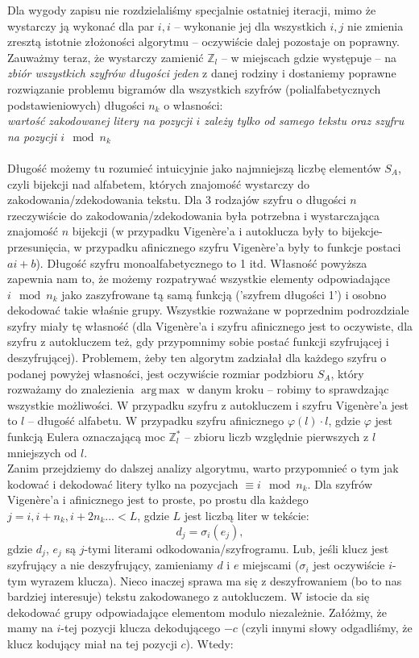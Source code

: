\documentclass[a4paper]{article}
\DeclareMathOperator*{\argmax}{arg\,max}
\theoremstyle{defn}
\theoremstyle{theorem}
\theoremstyle{lemma}
\theoremstyle{cor}
\theoremstyle{fact}
\begin{document}
Dla wygody zapisu nie rozdzielaliśmy specjalnie ostatniej iteracji, mimo że wystarczy ją wykonać dla par $i,i$ – wykonanie jej dla wszystkich $i,j$ nie zmienia zresztą istotnie złożoności algorytmu – oczywiście dalej pozostaje on poprawny.
Zauważmy teraz, że wystarczy zamienić $\mathbb{Z}_l$ – w miejscach gdzie występuje – na \textit{zbiór wszystkich szyfrów długości jeden} z danej rodziny i dostaniemy poprawne rozwiązanie problemu bigramów dla wszystkich szyfrów (polialfabetycznych podstawieniowych) długości $n_k$ o własności:\\
\textit{wartość zakodowanej litery na pozycji $i$ zależy tylko od samego tekstu oraz szyfru na pozycji $i \mod n_k$}\\\\
Długość możemy tu rozumieć intuicyjnie jako najmniejszą liczbę elementów $S_A$, czyli bijekcji nad alfabetem, których znajomość wystarczy do zakodowania/zdekodowania tekstu. Dla 3 rodzajów szyfru o długości $n$ rzeczywiście do zakodowania/zdekodowania była potrzebna i wystarczająca znajomość $n$ bijekcji (w przypadku Vigenère'a i autoklucza były to bijekcje-przesunięcia, w przypadku afinicznego szyfru Vigenère'a były to funkcje postaci $ai+b$). Długość szyfru monoalfabetycznego to 1 itd. Własność powyższa zapewnia nam to, że możemy rozpatrywać wszystkie elementy odpowiadające $i \mod n_k$ jako zaszyfrowane tą samą funkcją ('szyfrem długości 1') i osobno dekodować takie właśnie grupy. Wszystkie rozważane w poprzednim podrozdziale szyfry miały tę własność (dla Vigenère'a i szyfru afinicznego jest to oczywiste, dla szyfru z autokluczem też, gdy przypomnimy sobie postać funkcji szyfrującej i deszyfrującej). Problemem, żeby ten algorytm zadziałał dla każdego szyfru o podanej powyżej własności, jest oczywiście rozmiar podzbioru $S_A$, który rozważamy do znalezienia $\argmax$ w danym kroku – robimy to sprawdzając wszystkie możliwości. W przypadku szyfru z autokluczem i szyfru Vigenère'a jest to $l$ – długość alfabetu. W przypadku szyfru afinicznego $\varphi(l) \cdot l$, gdzie $\varphi$ jest funkcją Eulera oznaczającą moc $\mathbb{Z}_l^*$ – zbioru liczb względnie pierwszych z $l$ mniejszych od $l$.\\
Zanim przejdziemy do dalszej analizy algorytmu, warto przypomnieć o tym jak kodować i dekodować litery tylko na pozycjach $\equiv i \mod n_k$.
Dla szyfrów Vigenère'a i afinicznego jest to proste, po prostu dla każdego $j = i, i+n_k, i+2n_k... < L$, gdzie $L$ jest liczbą liter w tekście:
$$d_j = \sigma_i(e_j),$$
gdzie $d_j$, $e_j$ są $j$-tymi literami odkodowania/szyfrogramu. Lub, jeśli klucz jest szyfrujący a nie deszyfrujący, zamieniamy $d$ i $e$ miejscami ($\sigma_i$ jest oczywiście $i$-tym wyrazem klucza). Nieco inaczej sprawa ma się z deszyfrowaniem (bo to nas bardziej interesuje) tekstu zakodowanego z autokluczem. W istocie da się dekodować grupy odpowiadające elementom modulo niezależnie. Załóżmy, że mamy na $i$-tej pozycji klucza dekodującego $-c$ (czyli innymi słowy odgadliśmy, że klucz kodujący miał na tej pozycji $c$). Wtedy:
\end{document}
